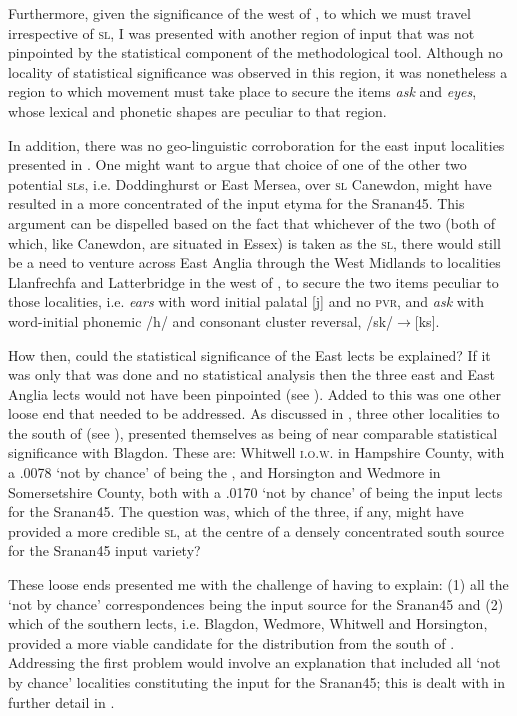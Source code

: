 Furthermore, given the significance of the west of , to which we must travel irrespective of \textsc{sl}, I was presented with another region of input that was not pinpointed by the statistical component of the methodological tool. Although no locality of statistical significance was observed in this region, it was nonetheless a region to which movement must take place to secure the items \emph{ask} and \emph{eyes}, whose lexical and phonetic shapes are peculiar to that region.

In addition, there was no geo-linguistic corroboration for the east  input localities presented in . One might want to argue that choice of one of the other two potential \textsc{sl}s, i.e. Doddinghurst or East Mersea, over \textsc{sl} Canewdon, might have resulted in a more concentrated  of the input etyma for the Sranan45. This argument can be dispelled based on the fact that whichever of the two (both of which, like Canewdon, are situated in Essex) is taken as the \textsc{sl}, there would still be a need to venture across East Anglia through the West Midlands to localities Llanfrechfa and Latterbridge in the west of , to secure the two items peculiar to those localities, i.e. \emph{ears} with word initial palatal [j] and no \textsc{pvr}, and \emph{ask} with word-initial phonemic /h/ and consonant cluster reversal, /sk/$\rightarrow$[ks].

How then, could the statistical significance of the East  lects be explained? If it was only  that was done and no statistical analysis then the three east and East Anglia lects would not have been pinpointed (see ). Added to this was one other loose end that needed to be addressed. As discussed in , three other localities to the south of  (see ), presented themselves as being of near comparable statistical significance with Blagdon. These are: Whitwell \textsc{i.o.w}. in Hampshire County, with a .0078 `not by chance'  of being the , and Horsington and Wedmore in Somersetshire County, both with a .0170 `not by chance'  of being the input lects for the Sranan45. The question was, which of the three, if any, might have provided a more credible \textsc{sl}, at the centre of a densely concentrated south  source for the Sranan45 input variety?

These loose ends presented me with the challenge of having to explain: (1) all the `not by chance' correspondences being the input source for the Sranan45 and (2) which of the southern  lects, i.e. Blagdon, Wedmore, Whitwell and Horsington, provided a more viable candidate for the distribution from the south of . Addressing the first problem would involve an explanation that included all `not by chance' localities constituting the input for the Sranan45; this is dealt with in further detail in .


